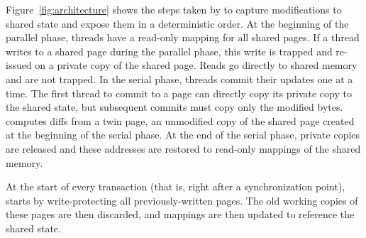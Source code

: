 Figure~\ref{fig:architecture} shows the steps taken by \dthreads{} to
capture modifications to shared state and expose them in a
deterministic order.  At the beginning of the parallel phase, threads
have a read-only mapping for all shared pages.  If a thread writes to
a shared page during the parallel phase, this write is trapped and
re-issued on a private copy of the shared page.  Reads go directly to
shared memory and are not trapped.  In the serial phase, threads
commit their updates one at a time.  The first thread to commit to a
page can directly copy its private copy to the shared state, but
subsequent commits must copy only the modified bytes.  \dthreads{} 
computes diffs from a twin page, an unmodified copy of the shared page created at 
the beginning of the serial phase.  At the end of the serial phase,
private copies are released and these addresses are restored to
read-only mappings of the shared memory.



\label{sec:atomicbegin}

At the start of every transaction (that is, right after a
synchronization point), \dthreads{} starts by write-protecting all
previously-written pages. The old working copies of these pages are
then discarded, and mappings are then updated to reference the shared
state.


